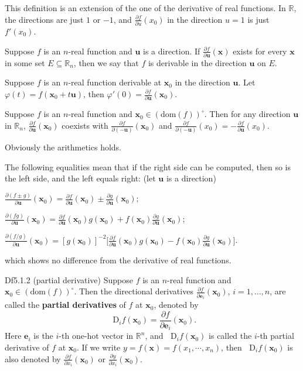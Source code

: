 \documentclass{article}
\newcommand{\parfrac}[2]{\frac{\partial #1}{\partial #2}}
\newcommand{\Dif}{\mathop{}\!\mathrm{D}}
\begin{document}
\begin{Rmk}{}
    \begin{compactenum}
        \item \textcolor{Th}{This definition is an extension of the one of the derivative of real functions. In $\mathbb{R}$, the directions are just $1$ or $-1$, and $\parfrac{f}{u}(x_0)$ in the direction $u=1$ is just $f'(x_0)$.}
        \item \textcolor{Df}{Suppose $f$ is an $n$-real function and $\pmb{u}$ is a direction. If $\parfrac{f}{\pmb{u}}(\pmb{x})$ exists for every $\pmb{x}$ in some set $E\subseteq\mathbb{R}_n$, then we say that $f$ is derivable in the direction $\pmb{u}$ on $E$.}
        \item \textcolor{Th}{Suppose $f$ is an $n$-real function derivable at $\pmb{x}_0$ in the direction $\pmb{u}$. Let $\varphi(t) = f(\pmb{x}_0 + t\pmb{u})$, then $\varphi'(0) = \parfrac{f}{\pmb{u}}(\pmb{x}_0)$.}
        \item \textcolor{Th}{Suppose $f$ is an $n$-real function and $\pmb{x}_0\in (\text{dom}(f))^\circ$. Then for any direction $\pmb{u}$ in $\mathbb{R}_n$, $\parfrac{f}{\pmb{u}}(\pmb{x}_0)$ coexists with $\parfrac{f}{(-\pmb{u})}(\pmb{x}_0)$ and $\parfrac{f}{(-\pmb{u})}(x_0) = -\parfrac{f}{\pmb{u}}(x_0)$.}
        \item Obviously the arithmetics holds. \textcolor{Th}{The following equalities mean that if the right side can be computed, then so is the left side, and the left equals right: (let $\pmb{u}$ is a direction)
        \begin{compactenum}
            \item $\parfrac{(f\pm g)}{\pmb{u}}(\pmb{x}_0) = \parfrac{f}{\pmb{u}}(\pmb{x}_0)\pm\parfrac{g}{\pmb{u}}(\pmb{x}_0)$;
            \item $\parfrac{(fg)}{\pmb{u}}(\pmb{x}_0) = \parfrac{f}{\pmb{u}}(\pmb{x}_0) g(\pmb{x}_0) + f(\pmb{x}_0)\parfrac{g}{\pmb{u}}(\pmb{x}_0)$;
            \item $\parfrac{(f/g)}{\pmb{u}}(\pmb{x}_0) = [g(\pmb{x}_0)]^{-2} \bigl[\parfrac{f}{\pmb{u}}(\pmb{x}_0)g(\pmb{x}_0) - f(\pmb{x}_0)\parfrac{g}{\pmb{u}}(\pmb{x}_0)\bigr]$.
        \end{compactenum}
        which shows no difference from the derivative of real functions.}
    \end{compactenum}
\end{Rmk}

\begin{Df}{Df5.1.2 (partial derivative)}
    Suppose $f$ is an $n$-real function and $\pmb{x}_0\in (\text{dom}(f))^\circ$. Then the directional derivatives $\parfrac{f}{\pmb{e}_i}(\pmb{x}_0)$, $i = 1, \dots, n$, are called the \textbf{partial derivatives} of $f$ at $\pmb{x}_0$, denoted by 
    $$\Dif_i f(\pmb{x}_0) = \parfrac{f}{\pmb{e}_i}(\pmb{x}_0).$$ 
    Here $\pmb{e}_i$ is the $i$-th one-hot vector in $\mathbb{R}^n$, and $\Dif_i f(\pmb{x}_0)$ is called the $i$-th partial derivative of $f$ at $\pmb{x}_0$. If we write $y = f(\pmb{x}) = f(x_1, \cdots, x_n)$, then $\Dif_i f(\pmb{x}_0)$ is also denoted by $\parfrac{f}{x_i}(\pmb{x}_0)$ or $\parfrac{y}{x_i}(\pmb{x}_0)$.
\end{Df}
\end{document}
